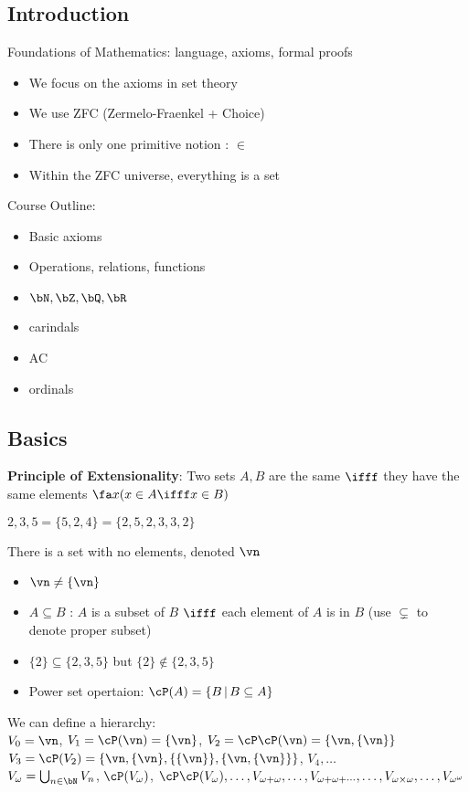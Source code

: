 
\subsection{Introduction}

Foundations of Mathematics: language, axioms, formal proofs
\begin{itemize}
    \item We focus on the axioms in set theory 
    \item We use ZFC (Zermelo-Fraenkel + Choice)
    \item There is only one primitive notion : $\in$
    \item Within the ZFC universe, everything is a set
\end{itemize}

\noindent 
Course Outline: 
\begin{itemize}
    \item Basic axioms
    \item Operations, relations, functions
    \item $\bN, \bZ, \bQ, \bR$
    \item carindals
    \item AC
    \item ordinals
\end{itemize}

\subsection{Basics}

\textbf{Principle of Extensionality}: Two sets $A, B$ are the same $\ifff$ they have the same elements $\fa x (x \in A \ifff x \in B)$ 

\begin{example}
    ${2, 3, 5} = \{5, 2, 4\} = \{2, 5, 2, 3, 3, 2\}$
\end{example}

\begin{definition}
    There is a set with no elements, denoted $\vn$
\end{definition}

\begin{itemize}
    \item $\vn \neq \{ \vn \}$
    \item $A \subseteq B$ : $A$ is a subset of $B$ $\ifff$ each element of $A$ is in $B$ (use $\subsetneq$ to denote proper subset)
    \item $\{2\} \subseteq \{2, 3, 5\}$ but $\{2\} \not\in \{2, 3, 5\}$
    \item Power set opertaion: $\cP(A) = \{ B \, | \, B \subseteq A\}$
\end{itemize}

\noindent 
We can define a hierarchy: \\
$V_0 = \vn$, $V_1 = \cP(\vn) = \{\vn\}$, $V_2 = \cP \cP (\vn) = \{\vn, \{ \vn \} \}$ \\
$V_3 = \cP(V_2) = \{\vn, \{\vn\}, \{\{ \vn \}\}, \{ \vn, \{\vn\}\}\}$, $V_4, \ldots $ \\
$V_{\omega} = \bigcup_{n \in \bN} V_n$, $\cP (V_{\omega})$, $\cP \cP (V_{\omega}), \ldots, V_{\omega + \omega}, \ldots, V_{\omega + \omega + \cdots}, \ldots, V_{\omega \times \omega}, \ldots, V_{\omega^{\omega}}$ 